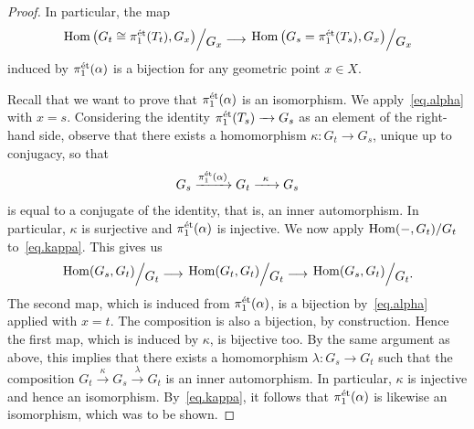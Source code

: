 \documentclass[12pt]{amsart}
\numberwithin{equation}{theorem}
\renewcommand{\:}{\colon}
\newcommand{\piet}{\pi_1^{\textnormal{\'{e}t}}} %
\theoremstyle{theorem}
\begin{document}
\begin{proof}
In particular, the map
\begin{equation} \label{eq.alpha}
\factor \Hom \big( G_t \cong \piet(T_t), G_x \big). G_x. \longrightarrow \factor \Hom \big( G_s = \piet(T_s), G_x \big). G_x.
\end{equation}
induced by $\piet(\alpha)$ is a bijection for any geometric point $x \in X$.

Recall that we want to prove that $\piet(\alpha)$ is an isomorphism.
We apply~\autoref{eq.alpha} with $x = s$.
Considering the identity $\pi_1^{\textnormal{{\'e}t}}(T_s) \xrightarrow{\ \ } G_s$ as an element of the right-hand side, observe that there exists a homomorphism $\kappa\colon G_t \to G_s$, unique up to conjugacy, so that
\begin{equation} \label{eq.kappa}
G_s \xrightarrow{\piet(\alpha)} G_t \xrightarrow{\;\;\kappa\;\;} G_s
\end{equation}
is equal to a conjugate of the identity, that is, an inner automorphism.
In particular, $\kappa$ is surjective and $\pi_1^{\textnormal{{\'e}t}}(\alpha)$ is injective.
We now apply $\operatorname{Hom}(-, G_t) / G_t$ to~\autoref{eq.kappa}. This gives us
\[ \factor \Hom(G_s, G_t). G_t. \longrightarrow \factor \Hom(G_t, G_t). G_t. \longrightarrow \factor \Hom(G_s, G_t). G_t.. \]
The second map, which is induced from $\piet(\alpha)$, is a bijection by~\autoref{eq.alpha} applied with $x = t$.
The composition is also a bijection, by construction.
Hence the first map, which is induced by $\kappa$, is bijective too.
By the same argument as above, this implies that there exists a homomorphism $\lambda\colon G_s \to G_t$ such that the composition $G_t \xrightarrow{\kappa} G_s \xrightarrow{\lambda} G_t$ is an inner automorphism.
In particular, $\kappa$ is injective and hence an isomorphism.
By~\autoref{eq.kappa}, it follows that $\piet(\alpha)$ is likewise an isomorphism, which was to be shown.
\end{proof}
\end{document}
